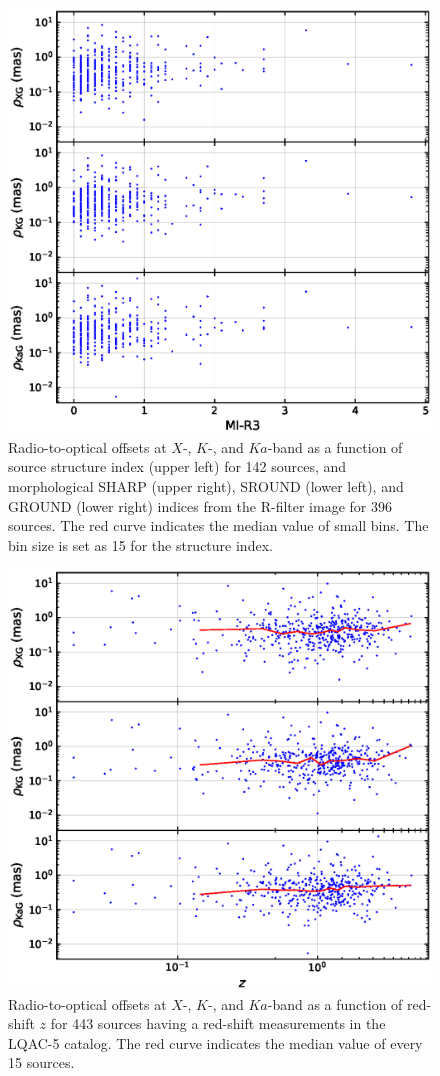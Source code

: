 \documentclass{aa}
\begin{document}
\begin{figure}[hbtp]
        \includegraphics[width=0.7\columnwidth]{figs/rho-I3R}
        \caption[]{\label{fig:rho-vs-si}
            Radio-to-optical offsets at $X$-, $K$-, and $Ka$-band as a function of source structure index  (upper left) for 142 sources, and
            morphological SHARP (upper right), SROUND (lower left), and GROUND (lower right) indices from the R-filter image for 396 sources.
            The red curve indicates the median value of small bins.
            The bin size is set as 15 for the structure index.
        }
    \end{figure}


    \begin{figure}[hbtp]
        \centering
        \includegraphics[width=0.7\columnwidth]{figs/rho-z}
        \caption[]{\label{fig:rho-z}
            Radio-to-optical offsets at $X$-, $K$-, and $Ka$-band as a function of red-shift $z$ for 443 sources having a red-shift measurements in the LQAC-5 catalog.
            The red curve indicates the median value of every 15 sources.
        }
    \end{figure}
\end{document}
